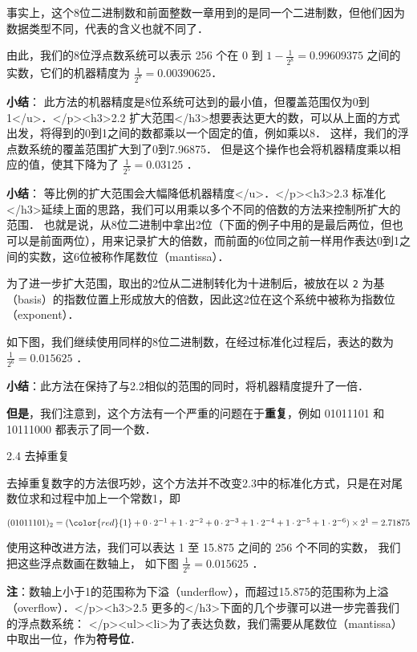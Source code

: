 事实上，这个8位二进制数和前面整数一章用到的是同一个二进制数，但他们因为数据类型不同，代表的含义也就不同了．

由此，我们的8位浮点数系统可以表示 256 个在 0 到  $1-\frac{1}{2^8}=0.99609375$  之间的实数，它们的机器精度为  $\frac{1}{2^8}=0.00390625$．

\textbf{小结}： 此方法的机器精度是8位系统可达到的最小值，但覆盖范围仅为0到1</u>．</p><h3>2.2 扩大范围</h3>想要表达更大的数，可以从上面的方式出发，将得到的0到1之间的数都乘以一个固定的值，例如乘以8． 这样，我们的浮点数系统的覆盖范围扩大到了0到7.96875． 但是这个操作也会将机器精度乘以相应的值，使其下降为了  $\frac{1}{2^5}=0.03125$  ．

\textbf{小结}： 等比例的扩大范围会大幅降低机器精度</u>．</p><h3>2.3 标准化</h3>延续上面的思路，我们可以用乘以多个不同的倍数的方法来控制所扩大的范围． 也就是说，从8位二进制中拿出2位（下面的例子中用的是最后两位，但也可以是前面两位），用来记录扩大的倍数，而前面的6位同之前一样用作表达0到1之间的实数，这6位被称作尾数位（mantissa）． 

为了进一步扩大范围，取出的2位从二进制转化为十进制后，被放在以 \verb|2| 为基（basis）的指数位置上形成放大的倍数，因此这2位在这个系统中被称为指数位（exponent）．

如下图，我们继续使用同样的8位二进制数，在经过标准化过程后，表达的数为 $\frac{1}{2^6}=0.015625$  ．

\textbf{小结}：此方法在保持了与2.2相似的范围的同时，将机器精度提升了一倍．

\textbf{但是}，我们注意到，这个方法有一个严重的问题在于\textbf{重复}，例如 01011101 和 10111000 都表示了同一个数．

2.4 去掉重复

去掉重复数字的方法很巧妙，这个方法并不改变2.3中的标准化方式，只是在对尾数位求和过程中加上一个常数1，即

 $(01011101)_2=({\color{red}{1}}+0\cdot2^{-1}+1\cdot2^{-2}+0\cdot2^{-3}+1\cdot2^{-4}+1\cdot2^{-5}+1\cdot2^{-6})\times2^1=2.71875$  

使用这种改进方法，我们可以表达 1 至 15.875 之间的 256 个不同的实数， 我们把这些浮点数画在数轴上， 如下图 $\frac{1}{2^6}=0.015625$  ．

\textbf{注}：数轴上小于1的范围称为下溢（underflow），而超过15.875的范围称为上溢（overflow）．</p><h3>2.5 更多的</h3>下面的几个步骤可以进一步完善我们的浮点数系统： </p><ul><li>为了表达负数，我们需要从尾数位（mantissa）中取出一位，作为\textbf{符号位}． 


